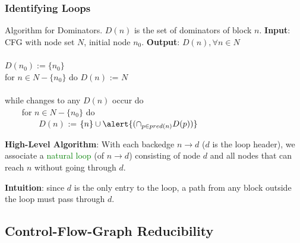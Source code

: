 \documentclass{beamer}
\newcommand{\green}[1]{\textcolor{Green}{{#1}}}
\newcommand{\emp}[1]{\textcolor{DikuRed}{ #1}}
\begin{document}
\begin{frame}[fragile,t]
    \frametitle{Identifying Loops}

\begin{block}{Algorithm for Dominators. $D(n)$ is the set of dominators of block $n$.}
{\bf Input}: \textsc{CFG} with node set $N$, initial node $n_0$.
{\bf Output}: $D(n), \forall n \in N$\\
{\tt~~}\\
$D(n_0) := \{ n_0 \}$\\
for $n \in N - \{n_0\}$ do $D(n)$ := $N$\\
{\tt~~}\\
while changes to any $D(n)$ occur do\\
{\tt~~~~}for $n \in N - \{n_0\}$ do\\
{\tt~~~~~~~~}$D(n)$ := $\{n\} \cup \alert{(\cap_{p\in pred(n)} D(p))}$
\end{block}

\pause
\bigskip

{\bf High-Level Algorithm}: With each \emp{backedge $n \rightarrow d$}
($d$ is the loop header), we associate a \green{natural loop} (of $n \rightarrow d$) 
consisting of node $d$ and all nodes that can reach $n$ without going through $d$.

\bigskip

{\bf Intuition}: since $d$ is the only entry to the loop, a path from any
block outside the loop must pass through $d$.

\end{frame}



\subsection{Control-Flow-Graph Reducibility}
\end{document}
